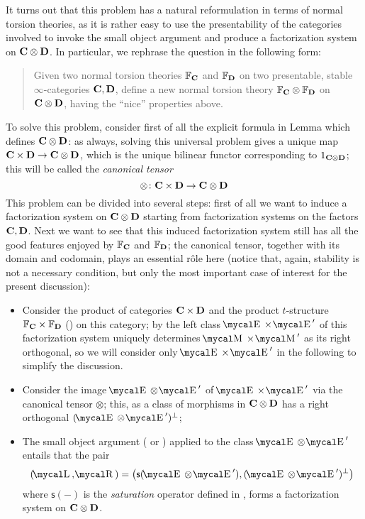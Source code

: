 It turns out that this problem has a natural reformulation in terms of normal torsion theories, as it is rather easy to use the presentability of the categories involved to invoke the small object argument and produce a factorization system on $\textbf{C}\otimes \textbf{D}$. In particular, we rephrase the question in the following form:
\begin{quote}
Given two normal torsion theories $\mathbb{F}_{\textbf{C}}$ and $\mathbb{F}_{\textbf{D}}$ on two presentable, stable $\infty$\hyp{}categories $\textbf{C},\textbf{D}$, define a new normal torsion theory $\mathbb{F}_{\textbf{C}}\otimes \mathbb{F}_{\textbf{D}}$ on $\textbf{C}\otimes \textbf{D}$, having the ``nice'' properties above.
\end{quote}
To solve this problem, consider first of all the explicit formula in Lemma  which defines $\textbf{C}\otimes \textbf{D}$: as always, solving this universal problem gives a unique map $\textbf{C}\times \textbf{D} \to \textbf{C}\otimes \textbf{D}$, which is the unique bilinear functor corresponding to $1_{\textbf{C}\otimes \textbf{D}}$; this will be called the \emph{canonical tensor}
\[
\otimes \colon \textbf{C} \times \textbf{D} \to \textbf{C}\otimes \textbf{D}
\]
This problem can be divided into several steps: first of all we want to induce a factorization system on $\textbf{C}\otimes\textbf{D}$ starting from factorization systems on the factors $\textbf{C}, \textbf{D}$. Next we want to see that this induced factorization system still has all the good features enjoyed by $\mathbb{F}_{\textbf{C}}$ and $\mathbb{F}_{\textbf{D}}$; the canonical tensor, together with its domain and codomain, plays an essential r\^ole here (notice that, again, stability is not a necessary condition, but only the most important case of interest for the present discussion):
\begin{itemize}
\item Consider the product of categories $\textbf{C}\times \textbf{D}$ and the product $t$\hyp{}structure $\mathbb{F}_{\textbf{C}}\times \mathbb{F}_{\textbf{D}}$ (\adef {}) on this category; by  the left class $\EE\times \EE'$ of this factorization system uniquely determines $\MM\times \MM'$ as its right orthogonal, so we will consider only $\EE\times \EE'$ in the following to simplify the discussion.
\item Consider the image $\EE \otimes \EE'$ of $\EE\times \EE'$ via the canonical tensor $\otimes$; this, as a class of morphisms in $\textbf{C} \otimes \textbf{D}$ has a right orthogonal $(\EE \otimes \EE')^\perp$;
\item {} The small object argument (\cite{Joyalcatlab} or \cite{Dwyer1995}) applied to the class $\EE\otimes \EE'$ entails that the pair
\[
(\mcal{L}, \mcal{R}) = \big(\textsf{s}(\EE \otimes \EE'), (\EE \otimes \EE')^\perp\big)
\]
where $\textsf{s}(-)$ is the \emph{saturation} operator defined in , forms a factorization system on $\textbf{C}\otimes \textbf{D}$.
\end{itemize}
